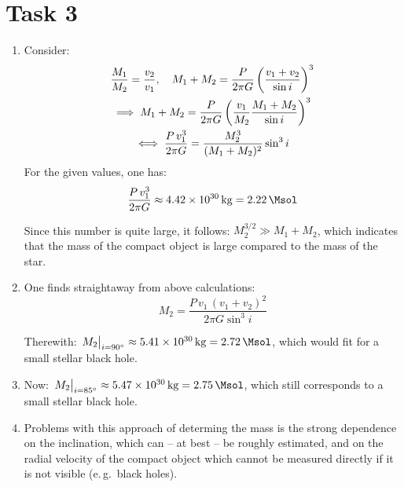 \documentclass[11pt,a4paper]{scrartcl}
\newcommand{\eg}{e.\,g.}
\begin{document}
\section*{Task 3}

\begin{enumerate}[label=\textbf{\large(\alph*)}, itemsep=\baselineskip]

\item
    Consider:
    \begin{gather*}
        \frac{M_1}{M_2}=\frac{v_2}{v_1}\qc
        M_1+M_2=\frac{P}{2\pi{G}}\left(\frac{v_1+v_2}{\sin{i}}\right)^3 \\
        \implies
        M_1+M_2=\frac{P}{2\pi{G}}\left(\frac{v_1}{M_2}\frac{M_1+M_2}{\sin{i}}\right)^3
        \\
        \iff\frac{P\,v_1^3}{2\pi{G}}=\frac{M_2^3}{(M_1+M_2)^2}\sin^3{i}
    \end{gather*}
    For the given values, one has:
    \begin{equation*}
        \frac{P\,v_1^3}{2\pi{G}}\approx\SI{4.42e30}{\kilogram}=\SI{2.22}{\Msol}
    \end{equation*}

    Since this number is quite large, it follows: $M_2^{3/2}\gg M_1+M_2$, which
    indicates that the mass of the compact object is large compared to the mass
    of the star.

\item
    One finds straightaway from above calculations:
    \begin{equation*}
        M_2=\frac{P\,v_1\,(v_1+v_2)^2}{2\pi{G}\sin^3{i}}
    \end{equation*}

    Therewith:
    $\eval{M_2}_{i=\ang{90}}\approx\SI{5.41e30}{\kilogram}=\SI{2.72}{\Msol}$,
    which would fit for a small stellar black hole.

\item
    Now: $\eval{M_2}_{i=\ang{85}}\approx\SI{5.47e30}{\kilogram}=\SI{2.75}{\Msol}$,
    which still corresponds to a small stellar black hole.

\item
    Problems with this approach of determing the mass is the strong dependence
    on the inclination, which can -- at best -- be roughly estimated, and on the
    radial velocity of the compact object which cannot be measured directly if
    it is not visible (\eg~black holes).

\end{enumerate}
\end{document}
